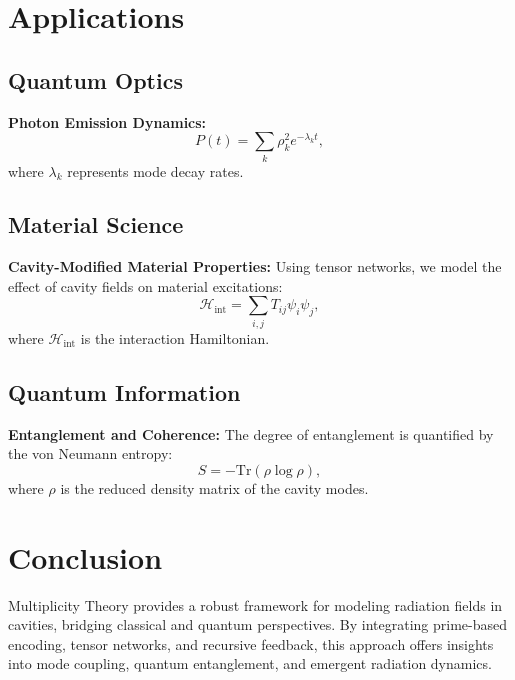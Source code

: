 \documentclass{article}
\theoremstyle{plain}
\begin{document}
\section{Applications}
\subsection{Quantum Optics}
\textbf{Photon Emission Dynamics:}
\begin{equation}
    P(t) = \sum_k \rho_k^2 e^{-\lambda_k t},
\end{equation}
where $\lambda_k$ represents mode decay rates.

\subsection{Material Science}
\textbf{Cavity-Modified Material Properties:}
Using tensor networks, we model the effect of cavity fields on material excitations:
\begin{equation}
    \mathcal{H}_{\text{int}} = \sum_{i,j} T_{ij} \psi_i \psi_j,
\end{equation}
where $\mathcal{H}_{\text{int}}$ is the interaction Hamiltonian.

\subsection{Quantum Information}
\textbf{Entanglement and Coherence:}
The degree of entanglement is quantified by the von Neumann entropy:
\begin{equation}
    S = -\text{Tr}(\rho \log \rho),
\end{equation}
where $\rho$ is the reduced density matrix of the cavity modes.

\section{Conclusion}
Multiplicity Theory provides a robust framework for modeling radiation fields in cavities, bridging classical and quantum perspectives. By integrating prime-based encoding, tensor networks, and recursive feedback, this approach offers insights into mode coupling, quantum entanglement, and emergent radiation dynamics.

\nocite{*}


\end{document}
